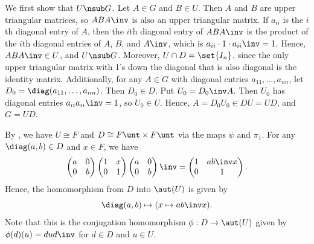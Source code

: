 \begin{solenum}
    \item We first show that $U \nsub G$.
    Let $A \in G$ and $B \in U$.
    Then $A$ and $B$ are upper triangular matrices, so $ABA\inv$ is also an upper triangular matrix.
    If $a_{ii}$ is the $i$th diagonal entry of $A$, then the $i$th diagonal entry of $ABA\inv$ is the product of the $i$th diagonal entries of $A$, $B$, and $A\inv$, which is $a_{ii} \cdot 1 \cdot a_{ii}\inv = 1$.
    Hence, $ABA\inv \in U$, and $U \nsub G$.
    Moreover, $U \cap D = \set{I_n}$, since the only upper triangular matrix with 1's down the diagonal that is also diagonal is the identity matrix.
    Additionally, for any $A \in G$ with diagonal entries $a_{11}, \ldots, a_{nn}$, let $D_0 = \diag(a_{11}, \ldots, a_{nn})$.
    Then $D_0 \in D$.
    Put $U_0 = D_0\inv A$.
    Then $U_0$ has diagonal entries $a_{ii}a_{ii}\inv = 1$, so $U_0 \in U$.
    Hence, $A = D_0U_0 \in DU = UD$, and $G = UD$.
    \item By , we have $U \cong F$ and $D \cong F\unt \times F\unt$ via the maps $\psi$ and $\pi_1$.
    For any $\diag(a, b) \in D$ and $x \in F$, we have
    \[
        \begin{pmatrix}
            a & 0 \\
            0 & b
        \end{pmatrix}
        \begin{pmatrix}
            1 & x \\
            0 & 1
        \end{pmatrix}
        \begin{pmatrix}
            a & 0 \\
            0 & b
        \end{pmatrix}\inv
        =
        \begin{pmatrix}
            1 & a b\inv x \\
            0 & 1
        \end{pmatrix}.
    \]
    Hence, the homomorphism from $D$ into $\aut(U)$ is given by
    \[
        \diag(a, b) \mapsto (x \mapsto ab\inv x).
    \]
    Note that this is the conjugation homomorphism $\phi : D \to \aut(U)$ given by $\phi(d)(u) = dud\inv$ for $d \in D$ and $u \in U$.
\end{solenum}


